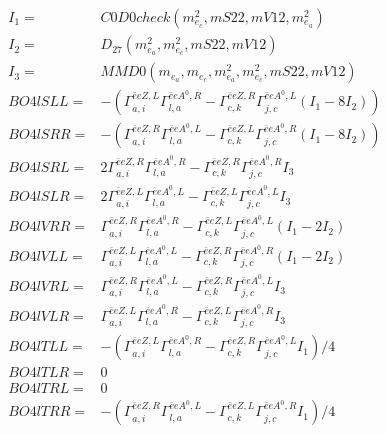 \documentclass[A4,landscape]{article}
\begin{document}
\begin{align} 
I_1 = & C0D0check(m^2_{e_{{c}}}, mS22, mV12, m^2_{e_{{a}}}) \\ 
I_2 = & D_{27}(m^2_{e_{{a}}}, m^2_{e_{{c}}}, mS22, mV12) \\ 
I_3 = & MMD0(m_{e_{{a}}}, m_{e_{{c}}}, m^2_{e_{{a}}}, m^2_{e_{{c}}}, mS22, mV12) \\ 
  BO4lSLL= & -( \Gamma^{\bar{e}e Z ,L}_{a, i} \Gamma^{\bar{e}e A^0 ,R}_{l, a} - \Gamma^{\bar{e}e Z ,R} _{c, k} \Gamma^{\bar{e}e A^0 ,L}_{j, c} (I_1 - 8 I_2)) \\ 
  BO4lSRR= & -( \Gamma^{\bar{e}e Z ,R}_{a, i} \Gamma^{\bar{e}e A^0 ,L}_{l, a} - \Gamma^{\bar{e}e Z ,L} _{c, k} \Gamma^{\bar{e}e A^0 ,R}_{j, c} (I_1 - 8 I_2)) \\ 
  BO4lSRL= & 2  \Gamma^{\bar{e}e Z ,R}_{a, i} \Gamma^{\bar{e}e A^0 ,R}_{l, a} - \Gamma^{\bar{e}e Z ,R} _{c, k} \Gamma^{\bar{e}e A^0 ,R}_{j, c} I_3 \\ 
  BO4lSLR= & 2  \Gamma^{\bar{e}e Z ,L}_{a, i} \Gamma^{\bar{e}e A^0 ,L}_{l, a} - \Gamma^{\bar{e}e Z ,L} _{c, k} \Gamma^{\bar{e}e A^0 ,L}_{j, c} I_3 \\ 
  BO4lVRR= &  \Gamma^{\bar{e}e Z ,R}_{a, i} \Gamma^{\bar{e}e A^0 ,R}_{l, a} - \Gamma^{\bar{e}e Z ,L} _{c, k} \Gamma^{\bar{e}e A^0 ,L}_{j, c} (I_1 - 2 I_2) \\ 
  BO4lVLL= &  \Gamma^{\bar{e}e Z ,L}_{a, i} \Gamma^{\bar{e}e A^0 ,L}_{l, a} - \Gamma^{\bar{e}e Z ,R} _{c, k} \Gamma^{\bar{e}e A^0 ,R}_{j, c} (I_1 - 2 I_2) \\ 
  BO4lVRL= &  \Gamma^{\bar{e}e Z ,R}_{a, i} \Gamma^{\bar{e}e A^0 ,L}_{l, a} - \Gamma^{\bar{e}e Z ,R} _{c, k} \Gamma^{\bar{e}e A^0 ,L}_{j, c} I_3 \\ 
  BO4lVLR= &  \Gamma^{\bar{e}e Z ,L}_{a, i} \Gamma^{\bar{e}e A^0 ,R}_{l, a} - \Gamma^{\bar{e}e Z ,L} _{c, k} \Gamma^{\bar{e}e A^0 ,R}_{j, c} I_3 \\ 
  BO4lTLL= & -( \Gamma^{\bar{e}e Z ,L}_{a, i} \Gamma^{\bar{e}e A^0 ,R}_{l, a} - \Gamma^{\bar{e}e Z ,R} _{c, k} \Gamma^{\bar{e}e A^0 ,L}_{j, c} I_1)/4 \\ 
  BO4lTLR= & 0 \\ 
  BO4lTRL= & 0 \\ 
  BO4lTRR= & -( \Gamma^{\bar{e}e Z ,R}_{a, i} \Gamma^{\bar{e}e A^0 ,L}_{l, a} - \Gamma^{\bar{e}e Z ,L} _{c, k} \Gamma^{\bar{e}e A^0 ,R}_{j, c} I_1)/4 \\ 
\end{align} 
\end{document}
